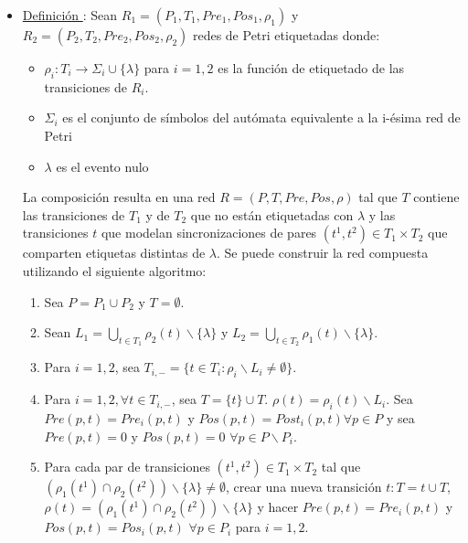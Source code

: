 \begin{itemize}
  \item \underline{Definición \thedefinitionsCounter}: Sean $R_{1} = (P_{1}, T_{1}, Pre_{1},
  Pos_{1}, \rho_{1})$ y $R_{2} = (P_{2}, T_{2}, Pre_{2}, Pos_{2}, \rho_{2})$
  redes de Petri etiquetadas donde:
  \begin{itemize}
    \item $\rho_{i} : T_{i} \rightarrow \Sigma_{i} \cup \{ \lambda \}$ para $i =
    1, 2$ es la función de etiquetado de las transiciones de $R_{i}$.
    \item $ \Sigma_{i} $ es el conjunto de símbolos del autómata equivalente a
    la i-ésima red de Petri
    \item $\lambda$ es el evento nulo
  \end{itemize} 
  La composición resulta en una red $R = (P, T, Pre, Pos, \rho)$ tal que $T$
  contiene las transiciones de $T_{1}$ y de $T_{2}$ que no están etiquetadas con
  $\lambda$ y las transiciones $t$ que modelan sincronizaciones de pares
  $(t^{1}, t^{2}) \in T_{1} \times T_{2}$ que comparten etiquetas distintas de
  $\lambda$.
  Se puede construir la red compuesta utilizando el siguiente algoritmo:
  \begin{enumerate}
    \item Sea $P = P_{1} \cup P_{2} $ y $T = \emptyset$.
    \item Sean $L_{1} = \bigcup_{t \in T_{1}} \rho_{2}(t) \backslash
    \{\lambda\}$ y $L_{2} = \bigcup_{t \in T_{2}} \rho_{1}(t) \backslash
    \{\lambda\}$.
    \item Para $i = 1, 2$, sea $T_{i,-} = \{ t \in T_{i}: \rho_{i} \backslash
    L_{i} \not = \emptyset \}$.
    \item Para $i = 1, 2, \forall t \in T_{i,-}$, sea $T = \{t\} \cup T$.
    $\rho(t) = \rho_{i}(t) \backslash L_{i}$. Sea $Pre(p, t) = Pre_{i}(p, t)$ y $Pos(p,
    t) = Post_{i}(p, t) \forall p \in P$ y sea $ Pre(p, t) = 0 $ y $ Pos(p,t) =
    0$ $\forall p \in P \backslash P_{i}$.
    \item Para cada par de transiciones $(t^{1}, t^{2}) \in T_{1} \times T_{2}$
    tal que $(\rho_{1}(t^{1}) \cap \rho_{2}(t^{2})) \backslash \{\lambda\} \not
    = \emptyset$, crear una nueva transición $t : T = {t} \cup T$, $\rho(t) =
    (\rho_{1}(t^{1}) \cap \rho_{2}(t^{2})) \backslash \{\lambda\}$ y hacer
    $Pre(p, t) = Pre_{i}(p,t)$ y $Pos(p, t) = Pos_{i}(p,t)$ $\forall p \in
    P_{i}$ para $i = 1, 2$.
  \end{enumerate}
\end{itemize}

